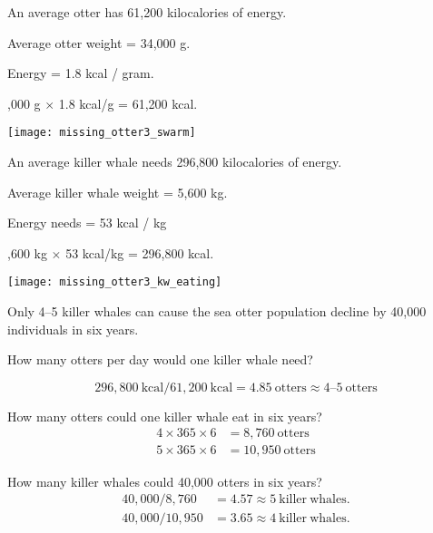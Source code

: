 \documentclass[t]{beamer}
\begin{document}
\begin{frame}[t]{An average otter has 61,200 kilocalories of energy.}

	\begin{multicols}{2}
	
	\hangpara Average otter weight = 34,000 g.
	
	\hangpara Energy = 1.8 kcal / gram.

	,000 g $\times$ 1.8 kcal/g = 61,200 kcal.

	\columnbreak
	
		\texttt{[image: missing\_otter3\_swarm]}
		
	\end{multicols}
	
\end{frame}
%
\begin{frame}[t]{An average killer whale needs 296,800 kilocalories of energy.}

	\begin{multicols}{2}
	
	\hangpara Average killer whale weight = 5,600 kg.
	
	\hangpara Energy needs = 53 kcal / kg

	,600 kg $\times$ 53 kcal/kg = 296,800 kcal.

	\columnbreak
	
		\texttt{[image: missing\_otter3\_kw\_eating]}
		
	\end{multicols}
	
\end{frame}
%
\begin{frame}[t]{Only 4--5 killer whales can cause the sea otter population decline by 40,000 individuals in six years.}

	\vspace*{-\baselineskip}
	
	\hangpara How many otters per day would one killer whale need?
		
		\[296,800\ \mathrm{kcal} / 61,200\ \mathrm{kcal} = 4.85\ \mathrm{otters} \approx 4\mathrm{–}5\ \mathrm{otters}\]
		
	\pause
	\hangpara How many otters could one killer whale eat in six years?
	\begin{align*}4 \times 365 \times 6 &= 8,760\ \mathrm{otters}\\
	5 \times 365 \times 6 &= 10,950\ \mathrm{otters}\end{align*}

	\pause
	\hangpara How many killer whales could 40,000 otters in six years?
	\begin{align*}40,000 / 8,760 &= 4.57 \approx 5\ \mathrm{killer\ whales.}\\
	40,000 / 10,950 &= 3.65 \approx 4\ \mathrm{killer\ whales.}\end{align*}

\end{frame}
%
\end{document}
